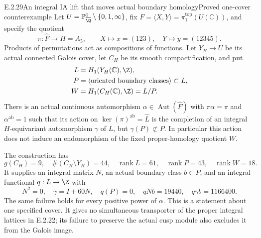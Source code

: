 \begin{result}{E.2.29}{An integral IA lift that moves actual boundary homology}{Proved one-cover counterexample}
Let \(U=\mathbb P^1_{\overline{\Q}}\setminus\{0,1,\infty\}\), fix
\(F=\langle X,Y\rangle=\pi_1^{\mathrm{top}}(U(\mathbb C))\),
and specify the quotient
\[
 \pi:\widehat F\longrightarrow H=A_5,\qquad
 X\longmapsto x=(123),\quad Y\longmapsto y=(12345).
 \tag{E.2.29a}
\]
Products of permutations act as compositions of functions. Let
\(Y_H\to U\) be its actual connected Galois cover, let \(C_H\)
be its smooth compactification, and put
\[
 \begin{aligned}
 L&=H_1(Y_H(\mathbb C),\Z),\\
 P&=\langle\text{oriented boundary classes}\rangle\subset L,\\
 W&=H_1(C_H(\mathbb C),\Z)=L/P .
 \end{aligned}
\]
There is an actual continuous automorphism
\(\alpha\in\operatorname{Aut}(\widehat F)\) with
\(\pi\alpha=\pi\) and \(\alpha^{\mathrm{ab}}=1\) such that
its action on
\(\ker(\pi)^{\mathrm{ab}}=\widehat L\) is the completion of
an integral \(H\)-equivariant automorphism \(\gamma\) of \(L\),
but \(\gamma(P)\not\subset P\). In particular this action
does not induce an endomorphism of the fixed proper-homology
quotient \(W\).

The construction has
\[
 g(C_H)=9,\quad \#(C_H\setminus Y_H)=44,\quad
 \operatorname{rank}L=61,\quad
 \operatorname{rank}P=43,\quad
 \operatorname{rank}W=18 .
 \tag{E.2.29b}
\]
It supplies an integral matrix \(N\), an actual boundary class
\(b\in P\), and an integral functional \(q:L\to\Z\) with
\[
 N^2=0,\quad \gamma=I+60N,\quad
 q(P)=0,\quad qNb=19440,\quad q\gamma b=1166400 .
 \tag{E.2.29c}
\]
The same failure holds for every positive power of \(\alpha\).
This is a statement about one specified cover. It gives no
simultaneous transporter of the proper integral lattices in
E.2.22; its failure to preserve the actual cusp module also
excludes it from the Galois image.
\end{result}
